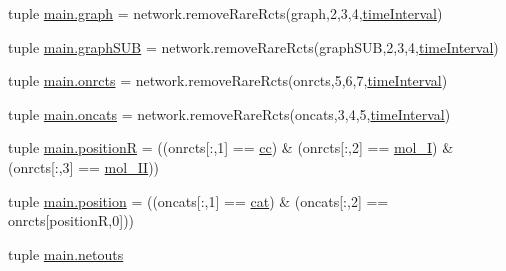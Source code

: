 \begin{DoxyCompactItemize}
tuple \hyperlink{a00151_a4cfdc01ecc5ad260a4f30c9353e3d856}{main.\-graph} = network.\-remove\-Rare\-Rcts(graph,2,3,4,\hyperlink{a00028_a430673c9821c17e4bf93cd42f59e00bb}{time\-Interval})
\item 
tuple \hyperlink{a00151_ab96de87bc8cbe59221256af996bdc43e}{main.\-graph\-S\-U\-B} = network.\-remove\-Rare\-Rcts(graph\-S\-U\-B,2,3,4,\hyperlink{a00028_a430673c9821c17e4bf93cd42f59e00bb}{time\-Interval})
\item 
tuple \hyperlink{a00151_ab26ffc3eda5d201a779d705813b06348}{main.\-onrcts} = network.\-remove\-Rare\-Rcts(onrcts,5,6,7,\hyperlink{a00028_a430673c9821c17e4bf93cd42f59e00bb}{time\-Interval})
\item 
tuple \hyperlink{a00151_ab4d380bc4bfcb970acc39ddf18a73972}{main.\-oncats} = network.\-remove\-Rare\-Rcts(oncats,3,4,5,\hyperlink{a00028_a430673c9821c17e4bf93cd42f59e00bb}{time\-Interval})
\item 
tuple \hyperlink{a00151_adbbdc0f6ad0f08400b3e492f7a807a6b}{main.\-position\-R} = ((onrcts\mbox{[}\-:,1\mbox{]} == \hyperlink{a00028_afb5980388a6e55ca55437b53cdaf528a}{cc}) \& (onrcts\mbox{[}\-:,2\mbox{]} == \hyperlink{a00028_ab346189eef5359a07ba32144ddcd4465}{mol\-\_\-\-I}) \& (onrcts\mbox{[}\-:,3\mbox{]} == \hyperlink{a00028_a4d2c086887289f8900b38ffa56854da3}{mol\-\_\-\-I\-I}))
\item 
tuple \hyperlink{a00151_ac67c60df3cc9afae7e4888d2b48b846d}{main.\-position} = ((oncats\mbox{[}\-:,1\mbox{]} == \hyperlink{a00028_a7073f71a43389f3032e69b1fffc2551a}{cat}) \& (oncats\mbox{[}\-:,2\mbox{]} == onrcts\mbox{[}position\-R,0\mbox{]}))
\item 
tuple \hyperlink{a00151_a02c2194d4e56d3d8c6d2c204a8017e3a}{main.\-netouts}
\end{DoxyCompactItemize}

